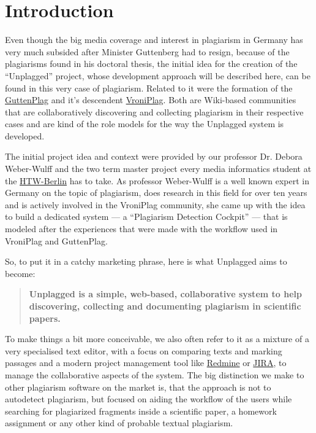 ﻿\chapter*{Introduction}

Even though the big media coverage and interest in plagiarism in Germany has very much subsided 
after Minister Guttenberg had to resign, because of the plagiarisms found in his doctoral thesis\citep{Google2012}, 
the initial idea for the 
creation of the \enquote{Unplagged} project, whose development approach will be described here, can be found in this 
very case of plagiarism. Related to it were the formation of the
\href{http://de.guttenplag.wikia.com/wiki/GuttenPlag\_Wiki}{GuttenPlag} and it's descendent 
\href{http://de.vroniplag.wikia.com/wiki/Home}{VroniPlag}. Both are Wiki-based communities that are collaboratively 
discovering and collecting plagiarism in their respective cases and are kind of the role models for the way the
Unplagged system is developed.

The initial project idea and context were provided by our professor Dr. Debora Weber-Wulff and the two term master project
every media informatics student at the \href{http://htw-berlin.de/}{HTW-Berlin} has to take. As professor Weber-Wulff is 
a well known expert in Germany on the
topic of plagiarism,
does research in this field for over ten years\citep{Spiegel-Online2011} and is actively involved in the VroniPlag
community, she came up with the idea to build a dedicated system --- a \enquote{Plagiarism Detection Cockpit}\citep{Weber-Wulff2011} --- 
that is modeled after the experiences that were made
with the workflow used in VroniPlag and GuttenPlag.

So, to put it in a catchy marketing phrase, here is what Unplagged aims to become: 

\begin{quote}
\textbf{Unplagged is a simple, web-based, collaborative system to help discovering, collecting and 
documenting plagiarism in scientific papers.}
\end{quote}

To make things a bit more conceivable, we also often refer to it as a mixture of a very specialised text editor, with a focus on 
comparing texts and marking 
passages and a modern project management tool like \href{http://www.redmine.org/}{Redmine} or 
\href{http://www.atlassian.com/JIRA}{JIRA}, 
to manage the collaborative aspects of the system. The big distinction we make to other plagiarism software on the market is, 
that the approach is not to autodetect plagiarism, but focused on aiding the workflow of the users while  
searching for plagiarized
fragments inside a scientific paper, a homework assignment or any other kind of probable textual plagiarism.

